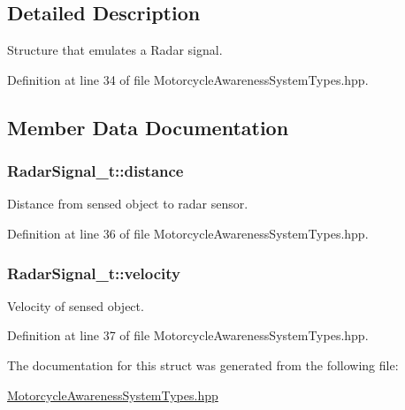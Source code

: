 \subsection{Detailed Description}
Structure that emulates a Radar signal. 

Definition at line 34 of file Motorcycle\-Awareness\-System\-Types.\-hpp.



\subsection{Member Data Documentation}
\hypertarget{structRadarSignal__t_a79f6d1be92d835eba8fe0646c37d1053}{
\subsubsection[{distance}]{ Radar\-Signal\-\_\-t\-::distance}}\label{structRadarSignal__t_a79f6d1be92d835eba8fe0646c37d1053}


Distance from sensed object to radar sensor. 



Definition at line 36 of file Motorcycle\-Awareness\-System\-Types.\-hpp.

\hypertarget{structRadarSignal__t_ac907ac4305b7d6c172661e95b030359d}{
\subsubsection[{velocity}]{ Radar\-Signal\-\_\-t\-::velocity}}\label{structRadarSignal__t_ac907ac4305b7d6c172661e95b030359d}


Velocity of sensed object. 



Definition at line 37 of file Motorcycle\-Awareness\-System\-Types.\-hpp.



The documentation for this struct was generated from the following file\-:\begin{DoxyCompactItemize}
\item 
\hyperlink{MotorcycleAwarenessSystemTypes_8hpp}{Motorcycle\-Awareness\-System\-Types.\-hpp}\end{DoxyCompactItemize}
